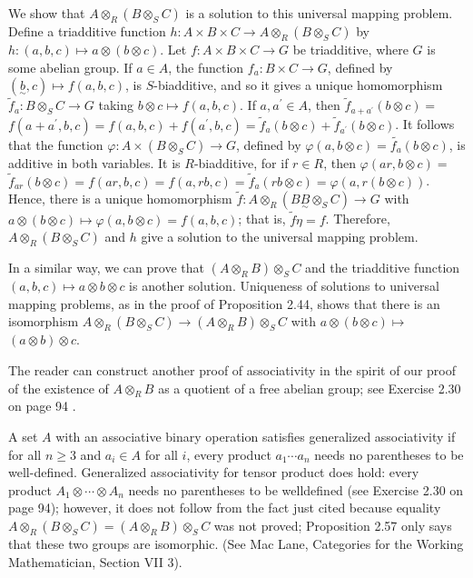 \documentclass[10pt]{article}
\begin{document}
We show that $A \otimes_{R}\left(B \otimes_{S} C\right)$ is a solution to this universal mapping problem. Define a triadditive function $h: A \times B \times C \rightarrow A \otimes_{R}\left(B \otimes_{S} C\right)$ by $h:(a, b, c) \mapsto a \otimes(b \otimes c)$. Let $f: A \times B \times C \rightarrow G$ be triadditive, where $G$ is some abelian group. If $a \in A$, the function $f_{a}: B \times C \rightarrow G$, defined by $(\underset{\sim}{b}, c) \mapsto f(a, b, c)$, is $S$-biadditive, and so it gives a unique homomorphism $\tilde{f}_{a}: B \otimes_{S} C \rightarrow G$ taking $b \otimes c \mapsto f(a, b, c)$. If $a, a^{\prime} \in A$, then $\tilde{f}_{a+a^{\prime}}(b \otimes c)=$ $f\left(a+a^{\prime}, b, c\right)=f(a, b, c)+f\left(a^{\prime}, b, c\right)=\widetilde{f}_{a}(b \otimes c)+\widetilde{f}_{a^{\prime}}(b \otimes c)$. It follows that the function $\varphi: A \times\left(B \otimes_{S} C\right) \rightarrow G$, defined by $\varphi(a, b \otimes c)=\widetilde{f_{a}}(b \otimes c)$, is additive in both variables. It is $R$-biadditive, for if $r \in R$, then $\varphi(a r, b \otimes c)=$ $\tilde{f}_{a r}(b \otimes c)=f(a r, b, c)=f(a, r b, c)=\tilde{f}_{a}(r b \otimes c)=\varphi(a, r(b \otimes c))$. Hence, there is a unique homomorphism $\tilde{f}: A \otimes_{R}\left(B \underset{\sim}{B} \otimes_{S} C\right) \rightarrow G$ with $a \otimes(b \otimes c) \mapsto \varphi(a, b \otimes c)=f(a, b, c)$; that is, $\widetilde{f} \eta=f$. Therefore, $A \otimes_{R}\left(B \otimes_{S} C\right)$ and $h$ give a solution to the universal mapping problem.

In a similar way, we can prove that $\left(A \otimes_{R} B\right) \otimes_{S} C$ and the triadditive function $(a, b, c) \mapsto a \otimes b \otimes c$ is another solution. Uniqueness of solutions to universal mapping problems, as in the proof of Proposition 2.44, shows that there is an isomorphism $A \otimes_{R}\left(B \otimes_{S} C\right) \rightarrow\left(A \otimes_{R} B\right) \otimes_{S} C$ with $a \otimes(b \otimes c) \mapsto$ $(a \otimes b) \otimes c$.

The reader can construct another proof of associativity in the spirit of our proof of the existence of $A \otimes_{R} B$ as a quotient of a free abelian group; see Exercise 2.30 on page 94 .

A set $A$ with an associative binary operation satisfies generalized associativity if for all $n \geq 3$ and $a_{i} \in A$ for all $i$, every product $a_{1} \cdots a_{n}$ needs no parentheses to be well-defined. Generalized associativity for tensor product does hold: every product $A_{1} \otimes \cdots \otimes A_{n}$ needs no parentheses to be welldefined (see Exercise 2.30 on page 94); however, it does not follow from the fact just cited because equality $A \otimes_{R}\left(B \otimes_{S} C\right)=\left(A \otimes_{R} B\right) \otimes_{S} C$ was not proved; Proposition 2.57 only says that these two groups are isomorphic. (See Mac Lane, Categories for the Working Mathematician, Section VII 3).
\end{document}
